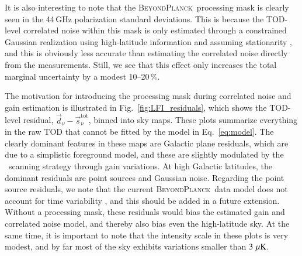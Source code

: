 \documentclass[twocolumn]{aa}
\renewcommand{\d}[0]{\vec{d}}
\newcommand{\s}[0]{\vec{s}}
\newcommand{\BP}{\textsc{BeyondPlanck}}
\begin{document}
It is also interesting to note that the \BP\ processing mask is
clearly seen in the 44\,GHz polarization standard deviations. This is
because the TOD-level correlated noise within this mask is only
estimated through a constrained Gaussian realization using
high-latitude information and assuming stationarity \citep{bp06},
and this is obviously less accurate than estimating the correlated
noise directly from the measurements. Still, we see that this effect
only increases the total marginal uncertainty by a modest 10--20\,\%.

The motivation for introducing the processing mask during correlated
noise and gain estimation is illustrated in
Fig.~\ref{fig:LFI_residuals}, which shows the TOD-level residual,
$\d_{\nu}-\s_{\nu}^{\mathrm{tot}}$, binned into sky maps. These plots
summarize everything in the raw TOD that cannot be fitted by the model
in Eq.~\eqref{eq:model}. The clearly dominant features in these maps
are Galactic plane residuals, which are due to a simplistic foreground 
model, and these are slightly modulated by the \Planck\ scanning
strategy through gain variations. At high Galactic latitudes, the
dominant residuals are point sources and Gaussian noise. Regarding the
point source residuals, we note that the current \BP\ data model does
not account for time variability \citep{rocha:2022}, and this should
be added in a future extension. Without a processing mask, these
residuals would bias the estimated gain and correlated noise model,
and thereby also bias even the high-latitude sky. At the same time, it
is important to note that the intensity scale in these plots is very
modest, and by far most of the sky exhibits variations smaller than
$3\,\muK$.
\end{document}
